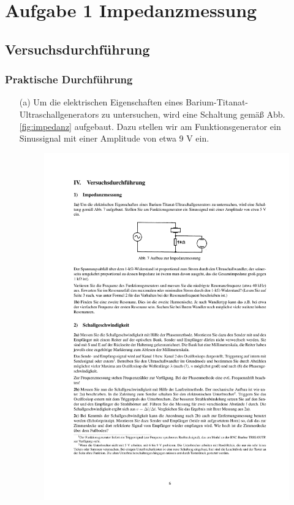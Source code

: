 \documentclass[12pt]{scrartcl}
\begin{document}
\section{Aufgabe 1 Impedanzmessung}
\subsection{Versuchsdurchführung}
\subsubsection{Praktische Durchführung}
\begin{itemize}
\item[(a)]
Um die elektrischen Eigenschaften eines Barium-Titanat-Ultraschallgenerators zu untersuchen, wird eine Schaltung gemäß Abb. \ref{fig:impedanz}
aufgebaut. Dazu stellen wir am Funktionsgenerator ein Sinussignal mit einer Amplitude von etwa 9 V ein.
\begin{figure}[htbp] 
  \centering
    \includegraphics[trim = 20mm 210mm 20mm 55mm, clip, scale = 1]{impedanz.pdf}

\end{figure}
\end{itemize}
\end{document}
